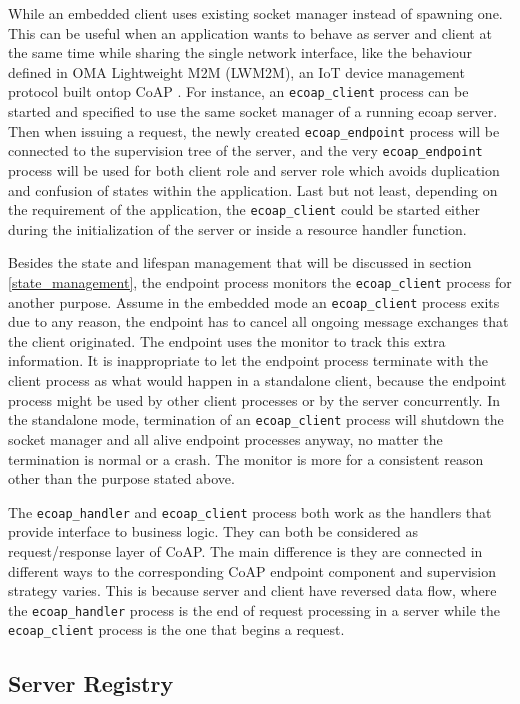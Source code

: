 While an embedded client uses existing socket manager instead of spawning one. This can be useful when an application wants to behave as server and client at the same time while sharing the single network interface, like the behaviour defined in OMA Lightweight M2M (LWM2M), an IoT device management protocol built ontop CoAP \cite{lwm2m}. For instance, an \verb|ecoap_client| process can be started and specified to use the same socket manager of a running ecoap server. Then when issuing a request, the newly created \verb|ecoap_endpoint| process will be connected to the supervision tree of the server, and the very \verb|ecoap_endpoint| process will be used for both client role and server role which avoids duplication and confusion of states within the application. Last but not least, depending on the requirement of the application, the \verb|ecoap_client| could be started either during the initialization of the server or inside a resource handler function.

Besides the state and lifespan management that will be discussed in section \ref{state_management}, the endpoint process monitors the \verb|ecoap_client| process for another purpose. Assume in the embedded mode an \verb|ecoap_client| process exits due to any reason, the endpoint has to cancel all ongoing message exchanges that the client originated. The endpoint uses the monitor to track this extra information. It is inappropriate to let the endpoint process terminate with the client process as what would happen in a standalone client, because the endpoint process might be used by other client processes or by the server concurrently. In the standalone mode, termination of an \verb|ecoap_client| process will shutdown the socket manager and all alive endpoint processes anyway, no matter the termination is normal or a crash. The monitor is more for a consistent reason other than the purpose stated above.

The \verb|ecoap_handler| and \verb|ecoap_client| process both work as the handlers that provide interface to business logic. They can both be considered as request/response layer of CoAP. The main difference is they are connected in different ways to the corresponding CoAP endpoint component and supervision strategy varies. This is because server and client have reversed data flow, where the \verb|ecoap_handler| process is the end of request processing in a server while the \verb|ecoap_client| process is the one that begins a request.

\subsection{Server Registry}\label{coap_registry}

